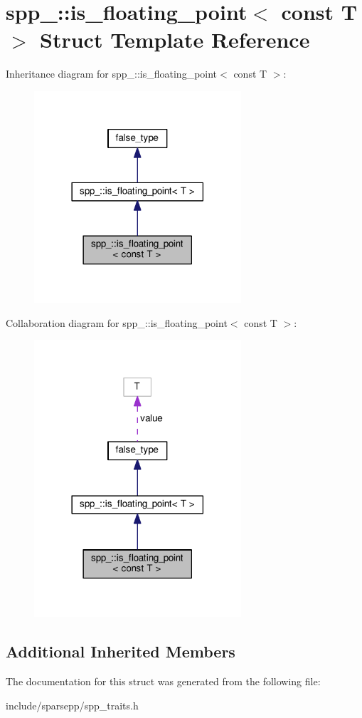 \hypertarget{structspp___1_1is__floating__point_3_01const_01_t_01_4}{}\section{spp\+\_\+\+:\+:is\+\_\+floating\+\_\+point$<$ const T $>$ Struct Template Reference}
\label{structspp___1_1is__floating__point_3_01const_01_t_01_4}


Inheritance diagram for spp\+\_\+\+:\+:is\+\_\+floating\+\_\+point$<$ const T $>$\+:\nopagebreak
\begin{figure}[H]
\begin{center}
\leavevmode
\includegraphics[width=218pt]{structspp___1_1is__floating__point_3_01const_01_t_01_4__inherit__graph}
\end{center}
\end{figure}


Collaboration diagram for spp\+\_\+\+:\+:is\+\_\+floating\+\_\+point$<$ const T $>$\+:\nopagebreak
\begin{figure}[H]
\begin{center}
\leavevmode
\includegraphics[width=218pt]{structspp___1_1is__floating__point_3_01const_01_t_01_4__coll__graph}
\end{center}
\end{figure}
\subsection*{Additional Inherited Members}


The documentation for this struct was generated from the following file\+:\begin{DoxyCompactItemize}
\item 
include/sparsepp/spp\+\_\+traits.\+h\end{DoxyCompactItemize}
